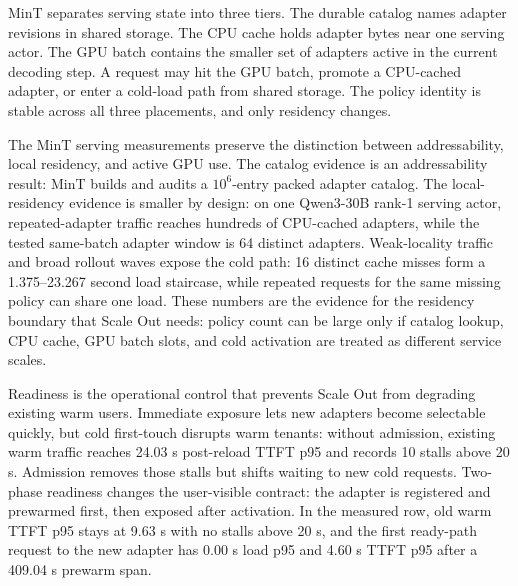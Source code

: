MinT separates serving state into three tiers. The durable catalog names adapter revisions in shared storage. The CPU cache holds adapter bytes near one serving actor. The GPU batch contains the smaller set of adapters active in the current decoding step. A request may hit the GPU batch, promote a CPU-cached adapter, or enter a cold-load path from shared storage. The policy identity is stable across all three placements, and only residency changes.



The MinT serving measurements preserve the distinction between addressability, local residency, and active GPU use. The catalog evidence is an addressability result: MinT builds and audits a $10^6$-entry packed adapter catalog. The local-residency evidence is smaller by design: on one Qwen3-30B rank-1 serving actor, repeated-adapter traffic reaches hundreds of CPU-cached adapters, while the tested same-batch adapter window is 64 distinct adapters. Weak-locality traffic and broad rollout waves expose the cold path: 16 distinct cache misses form a 1.375--23.267 second load staircase, while repeated requests for the same missing policy can share one load. These numbers are the evidence for the residency boundary that Scale Out needs: policy count can be large only if catalog lookup, CPU cache, GPU batch slots, and cold activation are treated as different service scales.



Readiness is the operational control that prevents Scale Out from degrading existing warm users. Immediate exposure lets new adapters become selectable quickly, but cold first-touch disrupts warm tenants: without admission, existing warm traffic reaches 24.03 s post-reload TTFT p95 and records 10 stalls above 20 s. Admission removes those stalls but shifts waiting to new cold requests. Two-phase readiness changes the user-visible contract: the adapter is registered and prewarmed first, then exposed after activation. In the measured row, old warm TTFT p95 stays at 9.63 s with no stalls above 20 s, and the first ready-path request to the new adapter has 0.00 s load p95 and 4.60 s TTFT p95 after a 409.04 s prewarm span.



